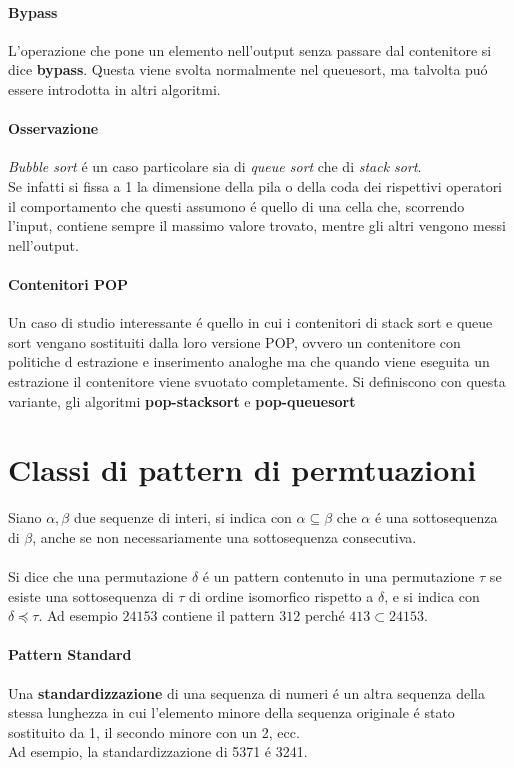 \paragraph*{Bypass} L'operazione che pone un elemento nell'output senza passare dal contenitore si dice \textbf{bypass}. Questa viene svolta normalmente nel queuesort, ma talvolta pu\'o essere introdotta in altri algoritmi.
\paragraph*{Osservazione}\textit{Bubble sort} \'e un caso particolare sia di \textit{queue sort} che di \textit{stack sort}.\\
Se infatti si fissa a 1 la dimensione della pila o della coda dei rispettivi operatori il comportamento che questi assumono \'e quello di una cella che, scorrendo l'input, contiene sempre il massimo valore trovato, mentre gli altri vengono messi nell'output.
\paragraph*{Contenitori POP}Un caso di studio interessante \'e quello in cui i contenitori di stack sort e queue sort vengano sostituiti dalla loro versione POP, ovvero un contenitore con politiche d estrazione e inserimento analoghe ma che quando viene eseguita un estrazione il contenitore viene svuotato completamente. Si definiscono con questa variante, gli algoritmi \textbf{pop-stacksort} e \textbf{pop-queuesort} 
\section*{Classi di pattern di permtuazioni}
\cite{bouvel2022preimages}
Siano $\alpha,\beta$ due sequenze di interi, si indica con $\alpha \subseteq \beta$ che $\alpha$ \'e una sottosequenza di $\beta$, anche se non necessariamente una sottosequenza consecutiva.\\\\
Si dice che una permutazione $\delta$ \'e un pattern contenuto in una permutazione $\tau$ se esiste una sottosequenza di $\tau$ di ordine isomorfico rispetto a $\delta$, e si indica con $\delta\preceq\tau$. Ad esempio $24153$ contiene il pattern $312$ perch\'e $413\subset{24153}$.
\paragraph*{Pattern Standard}
Una \textbf{standardizzazione}\cite{claesson2012sorting} di una sequenza di numeri \'e un altra sequenza della stessa lunghezza in cui l'elemento minore della sequenza originale \'e stato sostituito da 1, il secondo minore con un 2, ecc.\\
Ad esempio, la standardizzazione di 5371 \'e 3241.
